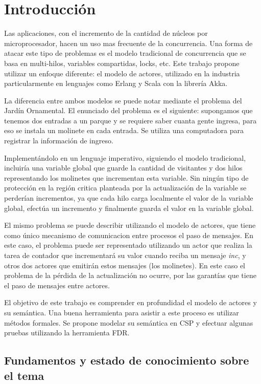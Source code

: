 \chapter{Introducción}

Las aplicaciones, con el incremento de la cantidad de núcleos por microprocesador, hacen un uso mas frecuente de la concurrencia. Una forma de atacar este tipo de problemas es el modelo tradicional de concurrencia que se basa en multi-hilos, variables compartidas, locks, etc. Este trabajo propone utilizar un enfoque diferente: el modelo de actores, utilizado en la industria particularmente en lenguajes como Erlang\cite{Cesarini:2009:EP:1717841} y Scala\cite{scala-overview-tech-report} con la librería Akka\cite{Wyatt:2013:AC:2663429}. 

La diferencia entre ambos modelos se puede notar mediante el problema del Jardín Ornamental. El enunciado del problema es el siguiente: supongamos que tenemos dos entradas a un parque y se requiere saber cuanta gente ingresa, para eso se instala un molinete en cada entrada. Se utiliza una computadora para registrar la información de ingreso.

Implementándolo en un lenguaje imperativo, siguiendo el modelo tradicional, incluiría una variable global que guarde la cantidad de visitantes y dos hilos representando los molinetes que incrementan esta variable. Sin ningún tipo de protección en la región critica planteada por la actualización de la variable se perderían incrementos, ya que cada hilo carga localmente el valor de la variable global, efectúa un incremento y finalmente guarda el valor en la variable global. 

El mismo problema se puede describir utilizando el modelo de actores, que tiene como único mecanismo de comunicacion entre procesos el paso de mensajes. En este caso, el problema puede ser representado utilizando un actor que realiza la tarea de contador que incrementará su valor cuando reciba un mensaje \emph{inc}, y otros dos actores que emitirán estos mensajes (los molinetes). En este caso el problema de la pérdida de la actualización no ocurre, por las garantías que tiene el paso de mensajes entre actores. 

El objetivo de este trabajo es comprender en profundidad el modelo de actores y su semántica. Una buena herramienta para asistir a este proceso es utilizar métodos formales. Se propone modelar su semántica en CSP y efectuar algunas pruebas utilizando la herramienta FDR\cite{fdr}.

\section{Fundamentos y estado de conocimiento sobre el tema}
 
